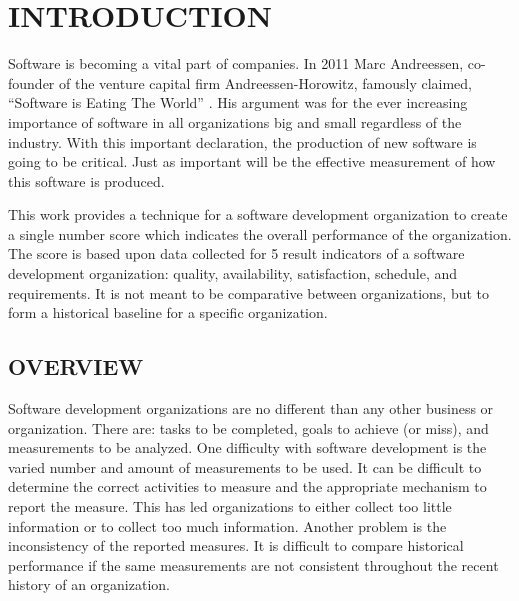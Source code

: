 \documentclass[SDSUThesis.tex]{subfiles}
\begin{document}
\newpage
{}
\setcounter{tocdepth}{2}

\section{INTRODUCTION}

    Software is becoming a vital part of companies. In 2011 Marc Andreessen, 
    co-founder of the venture capital firm Andreessen-Horowitz,
    famously claimed, ``Software is Eating The World'' \cite{Andreessen2001}. 
    His argument was for the ever increasing importance of software
    in all organizations big and small regardless of the industry.  With 
    this important declaration, the production of new software is
    going to be critical.  Just as important will be the effective 
    measurement of how this software is produced.  
    
    This work 
    provides a technique for a software development organization to create
    a single number score which indicates the overall performance
    of the organization. The
    score is based upon data collected for 5 result indicators
    of a software development organization: quality, availability,
    satisfaction, schedule, and requirements.  It is not meant
    to be comparative between organizations, but to 
    form a historical baseline for a specific organization.  

\subsection{OVERVIEW}
    
    Software development organizations are no different than 
    any other business or organization.  There are: tasks
    to be completed, goals to achieve (or miss), and measurements
    to be analyzed.  One difficulty with software development
    is the varied number and amount of measurements to be used. 
    It can be difficult to determine the correct activities
    to measure and the appropriate mechanism to report the measure.
    This has led organizations to either collect too little information
    or to collect too much information.  Another problem is the 
    inconsistency of the reported measures.  It is difficult to compare
    historical performance if the same measurements are not consistent
    throughout the recent history of an organization. 
    
\end{document}
